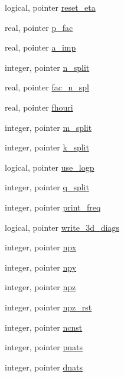 \begin{DoxyCompactItemize}
logical, pointer \hyperlink{classfv__control__mod_a6e851229cba913fe5086128ab28022aa}{reset\-\_\-eta}
\item 
real, pointer \hyperlink{classfv__control__mod_ad983b216be38cb6ce1bb231af7257939}{p\-\_\-fac}
\item 
real, pointer \hyperlink{classfv__control__mod_aceee4c7f56525845684efc1a4fa67422}{a\-\_\-imp}
\item 
integer, pointer \hyperlink{classfv__control__mod_a77f7e22e7cf16d6eb172e70cc2d00978}{n\-\_\-split}
\item 
real, pointer \hyperlink{classfv__control__mod_afc7f6b4f409eaa570ca132fad25816b7}{fac\-\_\-n\-\_\-spl}
\item 
real, pointer \hyperlink{classfv__control__mod_afc7eeadf515c9c1fc8b419404025f570}{fhouri}
\item 
integer, pointer \hyperlink{classfv__control__mod_a58306d27122b3238fc203cca6a6f73d4}{m\-\_\-split}
\item 
integer, pointer \hyperlink{classfv__control__mod_a79e7bc857b0773099d50877366fb9289}{k\-\_\-split}
\item 
logical, pointer \hyperlink{classfv__control__mod_a45d2ea868677009a92bac663e2a6fe55}{use\-\_\-logp}
\item 
integer, pointer \hyperlink{classfv__control__mod_a783be2fb9b692752e90b4ca57504be48}{q\-\_\-split}
\item 
integer, pointer \hyperlink{classfv__control__mod_ac0fcc8e15fdfcefc0e0e93e830b44748}{print\-\_\-freq}
\item 
logical, pointer \hyperlink{classfv__control__mod_abdedb56658d66d52ddd0462ddf5438fd}{write\-\_\-3d\-\_\-diags}
\item 
integer, pointer \hyperlink{classfv__control__mod_aa5bfdcfa4bf39b144d7f077526170b15}{npx}
\item 
integer, pointer \hyperlink{classfv__control__mod_a26b947c94b06e66f76f3e5cc38aa3a16}{npy}
\item 
integer, pointer \hyperlink{classfv__control__mod_ad0ff6f7684c200055fe2c239b67d1d54}{npz}
\item 
integer, pointer \hyperlink{classfv__control__mod_ad5083ad3c6d1a221b76b47973646c078}{npz\-\_\-rst}
\item 
integer, pointer \hyperlink{classfv__control__mod_aab6800a7f9ff32d719265330dbc16f1d}{ncnst}
\item 
integer, pointer \hyperlink{classfv__control__mod_acc1391e246a9a26aebf562ac3ab8232e}{pnats}
\item 
integer, pointer \hyperlink{classfv__control__mod_afecebcac01d762f645993aa69d99826c}{dnats}

\end{DoxyCompactItemize}
